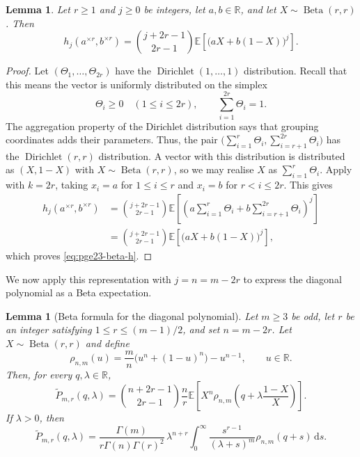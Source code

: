 \documentclass[11pt]{article}
\newtheorem{lemma}[theorem]{Lemma}
\theoremstyle{remark}
\numberwithin{equation}{section}
\newcommand{\R}{\mathbb R}
\newcommand{\dd}{\,\mathrm d}
\newcommand{\E}{\mathbb E}
\newcommand{\BetaLaw}{\operatorname{Beta}}
\begin{document}
\begin{lemma}\label{lem:pge23-beta-representation}
  Let $r\ge1$ and $j\ge0$ be integers, let $a,b\in\R$, and let
  $X\sim\BetaLaw(r,r)$. Then
  \begin{equation}\label{eq:pge23-beta-h}
    h_j(a^{\times r},b^{\times r})
    =\binom{j+2r-1}{2r-1}
    \E\left[\bigl(aX+b(1-X)\bigr)^j\right].
  \end{equation}
\end{lemma}

\begin{proof}
  Let $(\Theta_1,\ldots,\Theta_{2r})$ have the
  $\operatorname{Dirichlet}(1,\ldots,1)$ distribution.
  Recall that this means the vector is uniformly distributed on the simplex
  \[
    \Theta_i\ge0\quad(1\le i\le2r),\qquad
    \sum_{i=1}^{2r}\Theta_i=1.
  \]
  The aggregation property of the Dirichlet distribution says that grouping
  coordinates adds their parameters. Thus, the pair
  $\bigl(\sum_{i=1}^r\Theta_i,\sum_{i=r+1}^{2r}\Theta_i\bigr)$ has the
  $\operatorname{Dirichlet}(r,r)$ distribution.
  A vector with this distribution is distributed as $(X,1-X)$ with
  $X\sim\BetaLaw(r,r)$, so we may realise $X$ as $\sum_{i=1}^r\Theta_i$.
  Apply  with $k=2r$, taking $x_i=a$
  for $1\le i\le r$ and $x_i=b$ for $r<i\le2r$. This gives
  \begin{align*}
    h_j(a^{\times r},b^{\times r})
    &=\binom{j+2r-1}{2r-1}
      \E\left[\left(a\sum_{i=1}^r\Theta_i+
        b\sum_{i=r+1}^{2r}\Theta_i\right)^j\right]\\
    &=\binom{j+2r-1}{2r-1}\E\left[\bigl(aX+b(1-X)\bigr)^j\right],
  \end{align*}
  which proves \eqref{eq:pge23-beta-h}.
\end{proof}

We now apply this representation with $j=n=m-2r$ to express the diagonal
polynomial as a Beta expectation.

\begin{lemma}[Beta formula for the diagonal polynomial]\label{lem:pge23-beta}
  Let $m\ge3$ be odd, let $r$ be an integer satisfying
  $1\le r\le(m-1)/2$, and set $n=m-2r$.
  Let $X\sim\BetaLaw(r,r)$ and define
  \begin{equation}\label{eq:pge23-rho}
    \rho_{n,m}(u)
    =\frac {m}{n}\bigl(u^n+(1-u)^n\bigr)-u^{n-1},
    \qquad u\in\R.
  \end{equation}
  Then, for every $q,\lambda\in\R$,
  \begin{equation}\label{eq:pge23-beta-second}
    \widetilde P_{m,r}(q,\lambda)
    =\binom{n+2r-1}{2r-1}\frac {n}{r}
    \E\left[
    X^n\rho_{n,m}\left(q+\lambda\frac{1-X}{X}\right)
    \right].
  \end{equation}
  If $\lambda>0$, then
  \begin{equation}\label{eq:pge23-beta-integral}
    \widetilde P_{m,r}(q,\lambda)
    =\frac{\Gamma(m)}{r\Gamma(n)\Gamma(r)^2}\,
    \lambda^{n+r}
    \int_0^\infty
    \frac{s^{r-1}}{(\lambda+s)^m}\rho_{n,m}(q+s)\dd s.
  \end{equation}
\end{lemma}
\end{document}

